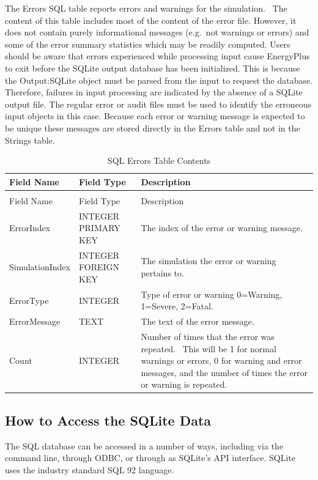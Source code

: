 The Errors SQL table reports errors and warnings for the simulation.~ The content of this table includes most of the content of the error file. However, it does not contain purely informational messages (e.g.~not warnings or errors) and some of the error summary statistics which may be readily computed. Users should be aware that errors experienced while processing input cause EnergyPlus to exit before the SQLite output database has been initialized. This is because the Output:SQLite object must be parsed from the input to request the database. Therefore, failures in input processing are indicated by the absence of a SQLite output file. The regular error or audit files must be used to identify the erroneous input objects in this case. Because each error or warning message is expected to be unique these messages are stored directly in the Errors table and not in the Strings table.

\begin{longtable}[c]{>{\raggedright}p{1.5in}>{\raggedright}p{1.5in}>{\raggedright}p{3in}}
\caption{SQL Errors Table Contents \label{table:table-42.-sql-errors-table-contents}} \tabularnewline
\toprule
Field Name & Field Type & Description \tabularnewline
\midrule
\endfirsthead

\caption[]{SQL Errors Table Contents} \tabularnewline
\toprule
Field Name & Field Type & Description \tabularnewline
\midrule
\endhead

ErrorIndex & INTEGER PRIMARY KEY & The index of the error or warning message. \tabularnewline
SimulationIndex & INTEGER FOREIGN KEY & The simulation the error or warning pertains to. \tabularnewline
ErrorType & INTEGER & Type of error or warning 0=Warning, 1=Severe, 2=Fatal. \tabularnewline
ErrorMessage & TEXT & The text of the error message. \tabularnewline
Count & INTEGER & Number of times that the error was repeated.~ This will be 1 for normal warnings or errors, 0 for warning and error messages, and the number of times the error or warning is repeated. \tabularnewline
\bottomrule
\end{longtable}

\subsection{How to Access the SQLite Data}\label{how-to-access-the-sqlite-data}

The SQL database can be accessed in a number of ways, including via the command line, through ODBC, or through as SQLite's API interface. SQLite uses the industry standard SQL 92 language.


